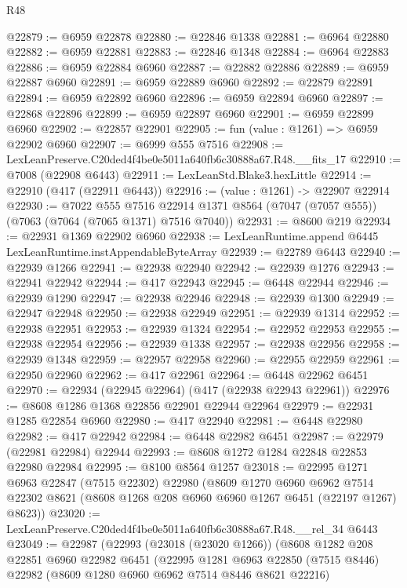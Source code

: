 \begin{lexlean}{R48}
\begin{coremodule}
@22879 := @6959 @22878
@22880 := @22846 @1338
@22881 := @6964 @22880
@22882 := @6959 @22881
@22883 := @22846 @1348
@22884 := @6964 @22883
@22886 := @6959 @22884 @6960
@22887 := @22882 @22886
@22889 := @6959 @22887 @6960
@22891 := @6959 @22889 @6960
@22892 := @22879 @22891
@22894 := @6959 @22892 @6960
@22896 := @6959 @22894 @6960
@22897 := @22868 @22896
@22899 := @6959 @22897 @6960
@22901 := @6959 @22899 @6960
@22902 := @22857 @22901
@22905 := fun (value : @1261) => @6959 @22902 @6960
@22907 := @6999 @555 @7516
@22908 := LexLeanPreserve.C20ded4f4be0e5011a640fb6c30888a67.R48.__fits_17
@22910 := @7008 (@22908 @6443)
@22911 := LexLeanStd.Blake3.hexLittle
@22914 := @22910 (@417 (@22911 @6443))
@22916 := (value : @1261) -> @22907 @22914
@22930 := @7022
    @555
    @7516
    @22914
    @1371
    @8564
    (@7047 (@7057 @555))
    (@7063 (@7064 (@7065 @1371) @7516 @7040))
@22931 := @8600 @219
@22934 := @22931 @1369 @22902 @6960
@22938 := LexLeanRuntime.append @6445 LexLeanRuntime.instAppendableByteArray
@22939 := @22789 @6443
@22940 := @22939 @1266
@22941 := @22938 @22940
@22942 := @22939 @1276
@22943 := @22941 @22942
@22944 := @417 @22943
@22945 := @6448 @22944
@22946 := @22939 @1290
@22947 := @22938 @22946
@22948 := @22939 @1300
@22949 := @22947 @22948
@22950 := @22938 @22949
@22951 := @22939 @1314
@22952 := @22938 @22951
@22953 := @22939 @1324
@22954 := @22952 @22953
@22955 := @22938 @22954
@22956 := @22939 @1338
@22957 := @22938 @22956
@22958 := @22939 @1348
@22959 := @22957 @22958
@22960 := @22955 @22959
@22961 := @22950 @22960
@22962 := @417 @22961
@22964 := @6448 @22962 @6451
@22970 := @22934 (@22945 @22964) (@417 (@22938 @22943 @22961))
@22976 := @8608 @1286 @1368 @22856 @22901 @22944 @22964
@22979 := @22931 @1285 @22854 @6960
@22980 := @417 @22940
@22981 := @6448 @22980
@22982 := @417 @22942
@22984 := @6448 @22982 @6451
@22987 := @22979 (@22981 @22984) @22944
@22993 := @8608 @1272 @1284 @22848 @22853 @22980 @22984
@22995 := @8100 @8564 @1257
@23018 := @22995
    @1271
    @6963
    @22847
    (@7515 @22302)
    @22980
    (@8609
      @1270
      @6960
      @6962
      @7514
      @22302
      @8621
      (@8608 @1268 @208 @6960 @6960 @1267 @6451 (@22197 @1267) @8623))
@23020 := LexLeanPreserve.C20ded4f4be0e5011a640fb6c30888a67.R48.__rel_34 @6443
@23049 := @22987
    (@22993
      (@23018 (@23020 @1266))
      (@8608
        @1282
        @208
        @22851
        @6960
        @22982
        @6451
        (@22995
          @1281
          @6963
          @22850
          (@7515 @8446)
          @22982
          (@8609 @1280 @6960 @6962 @7514 @8446 @8621 @22216)

\end{coremodule}
\end{lexlean}
